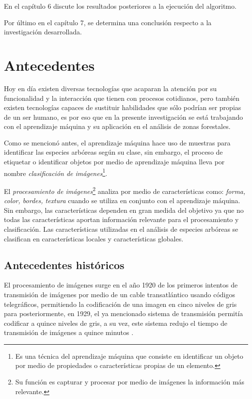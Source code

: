 En el capítulo 6 discute los resultados posteriores a la ejecución del algoritmo.

Por último en el capítulo 7, se determina una conclusión respecto a la investigación desarrollada.

\chapter{Antecedentes}
Hoy en día existen diversas tecnologías que acaparan la atención por su funcionalidad y la interacción que tienen con procesos cotidianos, pero también existen tecnologías capaces de sustituir habilidades que sólo podrían ser propias de un ser humano, es por eso que en la presente investigación se está trabajando con el aprendizaje máquina y su aplicación en el análisis de zonas forestales.

Como se mencionó antes, el aprendizaje máquina hace uso de muestras para identificar las especies arbóreas según su clase, sin embargo, el proceso de etiquetar o identificar objetos por medio de aprendizaje máquina lleva por nombre \emph{clasificación de imágenes}\footnote{Es una técnica del aprendizaje máquina que consiste en identificar un objeto por medio de propiedades o características propias de un elemento.}.

El \emph{procesamiento de imágenes}\footnote{Su función es capturar y procesar por medio de imágenes la información más relevante.} analiza por medio de características como: \emph{forma, color, bordes, textura} cuando se utiliza en conjunto con el aprendizaje máquina. Sin embargo, las características dependen en gran medida del objetivo ya que no todas las características aportan información relevante para el procesamiento y clasificación. Las características utilizadas en el análisis de especies arbóreas se clasifican en características locales y características globales.

\section{Antecedentes históricos}
El procesamiento de imágenes surge en el año 1920 de los primeros intentos de transmisión de imágenes por medio de un cable transatlántico usando códigos telegráficos, permitiendo la codificación de una imagen en cinco niveles de gris para posteriormente, en 1929, el ya mencionado sistema de transmisión permitía codificar a quince niveles de gris, a su vez, este sistema redujo el tiempo de transmisión de imágenes a quince minutos \citep{rf4}. 

